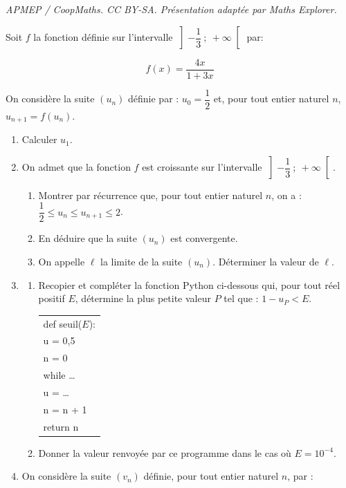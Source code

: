 \documentclass[10pt]{article}
\providecommand{\dotfill}{\ldots}
\begin{document}
\noindent\textit{APMEP / CoopMaths. CC BY-SA. Présentation adaptée par Maths Explorer.}\par\medskip
\medskip

Soit $f$ la fonction définie sur l'intervalle $\left]-\dfrac{1}{3}~;~+\infty\right[$ par:

\[ f(x) = \dfrac{4x}{1 + 3x}\]

On considère la suite $\left(u_n\right)$ définie par : $u_0 = \dfrac{1}{2}$ et, pour tout entier naturel $n$,\, $u_{n+1} = f\left(u_n\right)$.

\medskip

\begin{enumerate}
\item Calculer $u_1$.
\item On admet que la fonction $f$ est croissante sur l'intervalle $\left]-\dfrac{1}{3}~;~+\infty\right[$.
	\begin{enumerate}
		\item Montrer par récurrence que, pour tout entier naturel $n$, on a : $\dfrac{1}{2} \leqslant u_n \leqslant u_{n+1} \leqslant 2$.
		\item En déduire que la suite $\left(u_n\right)$ est convergente.
		\item On appelle $\ell$ la limite de la suite $\left(u_n\right)$. Déterminer la valeur de $\ell$.
	\end{enumerate}
\item 
	\begin{enumerate}
		\item Recopier et compléter la fonction Python ci-dessous qui, pour tout réel positif $E$, détermine la plus petite valeur $P$ tel que : $1 - u_{P} < E$.
		
\begin{center}
\begin{tabularx}{0.4\linewidth}{|X|}\hline
def seuil($E$):\\
\quad u = 0,5\\
\quad n = 0 \\
\quad  while \dotfill\\
\quad \quad u = \dotfill\\
\quad \quad n = n + 1\\
\quad return n\\ \hline
\end{tabularx}
\end{center}
		\item Donner la valeur renvoyée par ce programme dans le cas où $E= 10^{-4}$.
	\end{enumerate}
\item On considère la suite $\left(v_n\right)$ définie, pour tout entier naturel $n$, par :


\end{enumerate}
\end{document}

